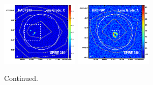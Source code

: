 \documentclass[iop]{emulateapj}
\begin{document}
\begin{figure}[!tbp]
\begin{centering}
\includegraphics[width=0.331\textwidth]{../Figures/overlays/HADFS10_870_250.pdf}
\includegraphics[width=0.331\textwidth]{../Figures/overlays/HADFS01_870_250.pdf}
\end{centering}

\caption{ Continued.}
\addtocounter{figure}{-1}

\end{figure}
\end{document}

